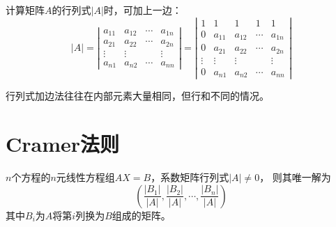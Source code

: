 \begin{theorem}[行列式加边法]
  计算矩阵$A$的行列式$|A|$时，可加上一边：
  \begin{equation*}
    |A| = \left|
      \begin{array}{cccc}
        a_{11}&a_{12}&\cdots&a_{1n}\\
        a_{21}&a_{22}&\cdots&a_{2n} \\
              \vdots&\vdots&&\vdots \\
              a_{n1}&a_{n2}&\cdots&a_{nn}
      \end{array}
    \right| = \left|
      \begin{array}{ccccc}
        1&1&1&1&1\\
        0&a_{11}&a_{12}&\cdots&a_{1n}\\
        0&a_{21}&a_{22}&\cdots&a_{2n} \\
        \vdots&\vdots&\vdots&&\vdots \\
        0&a_{n1}&a_{n2}&\cdots&a_{nn}
      \end{array}
    \right|
  \end{equation*}
\end{theorem}

\begin{note}
  行列式加边法往往在内部元素大量相同，但行和不同的情况。
\end{note}


\section{Cramer法则}

\begin{theorem}[Cramer法则]
  $n$个方程的$n$元线性方程组$AX = B$，系数矩阵行列式$|A| \neq 0$，
  则其唯一解为
  \begin{equation*}
    \left( \frac{|B_1|}{|A|}, \frac{|B_2|}{|A|},\cdots, \frac{|B_n|}{|A|} \right)
  \end{equation*}
  其中$B_i$为$A$将第$i$列换为$B$组成的矩阵。
\end{theorem}








